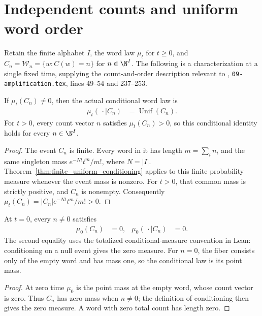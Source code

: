 \section{Independent counts and uniform word order}
\label{sec:poisson_uniform_order}

Retain the finite alphabet $I$, the word law $\mu_t$ for $t\ge0$, and
$C_n=\mathcal W_n=\{w:C(w)=n\}$ for $n\in\N^I$.
The following is a characterization at a single fixed time, supplying the
count-and-order description relevant to \cite{OpenAI2026AreaLaw},
\texttt{09-amplification.tex}, lines 49--54 and 237--253.

\begin{theorem}
\label{thm:poisson_conditional_order}
\leanok
{}
If $\mu_t(C_n)\ne0$, then the actual conditional word law is
\begin{align}
 \mu_t(\,\cdot\mid C_n)&=\operatorname{Unif}(C_n).
 \label{eq:poisson_conditional_order}
\end{align}
For $t>0$, every count vector $n$ satisfies $\mu_t(C_n)>0$, so this
conditional identity holds for every $n\in\N^I$.
\end{theorem}
\begin{proof}
\leanok
{}
The event $C_n$ is finite. Every word in it has length $m=\sum_i n_i$
and the same singleton mass $e^{-Nt}t^m/m!$, where $N=|I|$.
Theorem~\ref{thm:finite_uniform_conditioning} applies to this finite
probability measure whenever the event mass is nonzero.
For $t>0$, that common mass is strictly positive, and $C_n$ is nonempty.
Consequently $\mu_t(C_n)=|C_n|e^{-Nt}t^m/m!>0$.
\end{proof}

\begin{lemma}
\label{lem:poisson_null_count_conditioning}
\leanok
{}
At $t=0$, every $n\ne0$ satisfies
\begin{align}
 \mu_0(C_n)&=0,& \mu_0(\,\cdot\mid C_n)&=0.
 \label{eq:poisson_null_count_conditioning}
\end{align}
The second equality uses the totalized conditional-measure convention in
Lean: conditioning on a null event gives the zero measure.
For $n=0$, the fiber consists only of the empty word and has mass one,
so the conditional law is its point mass.
\end{lemma}
\begin{proof}
\leanok
{}
At zero time $\mu_0$ is the point mass at the empty word, whose count vector
is zero. Thus $C_n$ has zero mass when $n\ne0$; the definition of conditioning
then gives the zero measure. A word with zero total count has length zero.
\end{proof}

